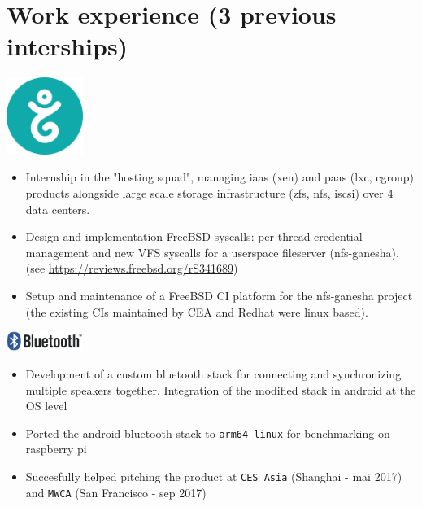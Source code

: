 \section{Work experience (3 previous interships)}

\noindent
\begin{minipage}{.15\textwidth}
    \centerline{\includegraphics[width=25mm]{img/gandi}}
\end{minipage}%
\hspace{5mm}
\begin{minipage}{.8\textwidth}
    \raggedright
    \begin{itemize}
	\item Internship in the "hosting squad", managing iaas (xen) and paas (lxc, cgroup) products alongside large scale storage infrastructure (zfs, nfs, iscsi) over 4 data centers.
	\item Design and implementation FreeBSD syscalls: per-thread credential management and new VFS syscalls for a userspace fileserver (nfs-ganesha).\newline (see \url{https://reviews.freebsd.org/rS341689})
	\item Setup and maintenance of a FreeBSD CI platform for the nfs-ganesha project (the existing CIs maintained by CEA and Redhat were linux based).
    \end{itemize}
\end{minipage}

\noindent
\begin{minipage}{.15\textwidth}
    \centerline{\includegraphics[width=25mm]{img/bluetooth}}
\end{minipage}%
\hspace{5mm}
\begin{minipage}{.8\textwidth}
    \raggedright
    \begin{itemize}
	\item Development of a custom bluetooth stack for connecting and synchronizing multiple speakers together. Integration of the modified stack in android at the OS level
	\item Ported the android bluetooth stack to \texttt{arm64-linux} for benchmarking on raspberry pi
	\item Succesfully helped pitching the product at \texttt{CES Asia} (Shanghai - mai 2017) and \texttt{MWCA} (San Francisco - sep 2017)
    \end{itemize}
\end{minipage}


